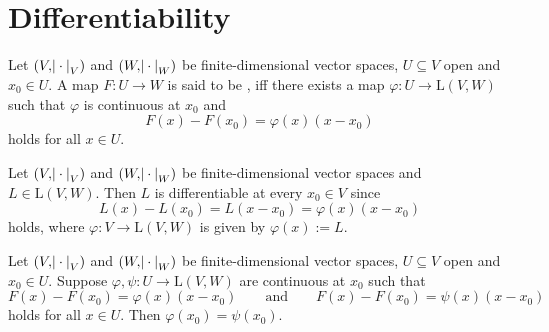 \section*{Differentiability}

\begin{definition}
	Let $(V,\abs{\>\cdot\>}_V)$ and $(W,\abs{\>\cdot\>}_W)$ be finite-dimensional vector spaces, $U \subseteq V$ open and $x_0 \in U$. A map $F : U \to W$ is said to be , iff there exists a map $\varphi : U \to \mathrm{L}(V,W)$ such that $\varphi$ is continuous at $x_0$ and
	\begin{equation}
		\label{eq:differentiable}
		F(x) - F(x_0) = \varphi(x)(x - x_0)
	\end{equation}
	\noindent holds for all $x \in U$. 
\end{definition}

\begin{example}
	\label{ex:linear_map_differential}
	Let $(V,\abs{\>\cdot\>}_V)$ and $(W,\abs{\>\cdot\>}_W)$ be finite-dimensional vector spaces and $L \in \mathrm{L}(V,W)$. Then $L$ is differentiable at every $x_0 \in V$ since
	\begin{equation*}
		L(x) - L(x_0) = L(x - x_0) = \varphi(x)(x - x_0)
	\end{equation*}
	\noindent holds, where $\varphi : V \to \mathrm{L}(V,W)$ is given by $\varphi(x) := L$.
\end{example} 

\begin{proposition}
	Let $(V,\abs{\>\cdot\>}_V)$ and $(W,\abs{\>\cdot\>}_W)$ be finite-dimensional vector spaces, $U \subseteq V$ open and $x_0 \in U$. Suppose $\varphi,\psi : U \to \mathrm{L}(V,W)$ are continuous at $x_0$ such that  
	\begin{equation*}
		F(x) - F(x_0) = \varphi(x)(x - x_0) \qquad \text{and} \qquad F(x) - F(x_0) = \psi(x)(x - x_0)
	\end{equation*}	
	\noindent holds for all $x \in U$. Then $\varphi(x_0) = \psi(x_0)$.
\end{proposition}

